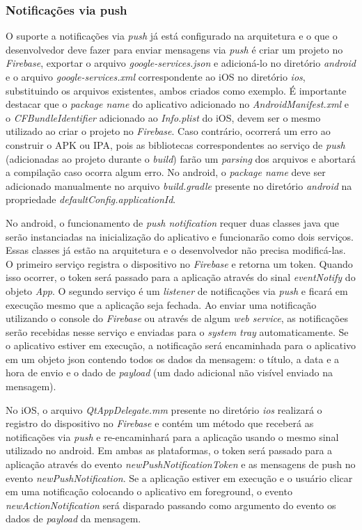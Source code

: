 \subsubsection{Notificações via push}
O suporte a notificações via \textit{push} já está configurado na arquitetura e o que o desenvolvedor deve fazer para enviar mensagens via \textit{push} é criar um projeto no \textit{Firebase}, exportar o arquivo \textit{google-services.json} e adicioná-lo no diretório \textit{android} e o arquivo \textit{google-services.xml} correspondente ao iOS no diretório \textit{ios}, substituindo os arquivos existentes, ambos criados como exemplo. É importante destacar que o \textit{package name} do aplicativo adicionado no \textit{AndroidManifest.xml} e o \textit{CFBundleIdentifier} adicionado ao \textit{Info.plist} do iOS, devem ser o mesmo utilizado ao criar o projeto no \textit{Firebase}. Caso contrário, ocorrerá um erro ao construir o APK ou IPA, pois as bibliotecas correspondentes ao serviço de \textit{push} (adicionadas ao projeto durante o \textit{build}) farão um \textit{parsing} dos arquivos e abortará a compilação caso ocorra algum erro. No android, o \textit{package name} deve ser adicionado manualmente no arquivo \textit{build.gradle} presente no diretório \textit{android} na propriedade \textit{defaultConfig.applicationId}.\par

No android, o funcionamento de \textit{push notification} requer duas classes java que serão instanciadas na inicialização do aplicativo e funcionarão como dois serviços. Essas classes já estão na arquitetura e o desenvolvedor não precisa modificá-las. O primeiro serviço registra o dispositivo no \textit{Firebase} e retorna um token. Quando isso ocorrer, o token será passado para a aplicação através do sinal \textit{eventNotify} do objeto \textit{App}. O segundo serviço é um \textit{listener} de notificações via \textit{push} e ficará em execução mesmo que a aplicação seja fechada. Ao enviar uma notificação utilizando o console do \textit{Firebase} ou através de algum \textit{web service}, as notificações serão recebidas nesse serviço e enviadas para o \textit{system tray} automaticamente. Se o aplicativo estiver em execução, a notificação será encaminhada para o aplicativo em um objeto json contendo todos os dados da mensagem: o título, a data e a hora de envio e o dado de \textit{payload} (um dado adicional não visível enviado na mensagem).\par

No iOS, o arquivo \textit{QtAppDelegate.mm} presente no diretório \textit{ios} realizará o registro do dispositivo no \textit{Firebase} e contém um método que receberá as notificações via \textit{push} e re-encaminhará para a aplicação usando o mesmo sinal utilizado no android. Em ambas as plataformas, o token será passado para a aplicação através do evento \textit{newPushNotificationToken} e as mensagens de push no evento \textit{newPushNotification}. Se a aplicação estiver em execução e o usuário clicar em uma notificação colocando o aplicativo em foreground, o evento \textit{newActionNotification} será disparado passando como argumento do evento os dados de \textit{payload} da mensagem.\par

